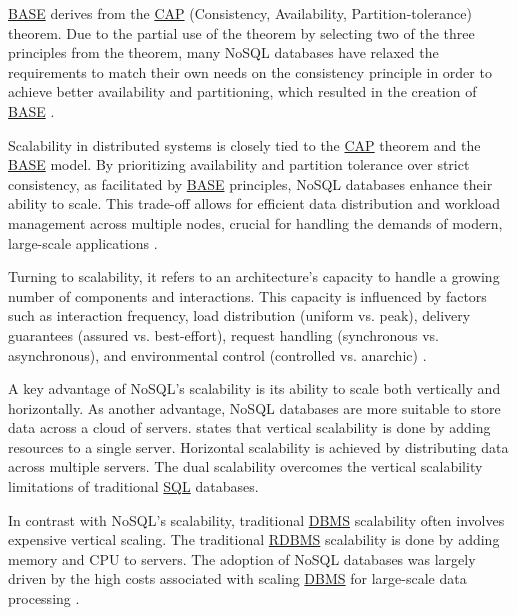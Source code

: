 \hyperref[appendix:glossary]{BASE} derives from the \hyperref[appendix:glossary]{CAP} (Consistency, Availability, Partition-tolerance) theorem. Due to the partial use of the theorem by selecting two of the three principles from the theorem, many NoSQL databases have relaxed the requirements to match their own needs on the consistency principle in order to achieve better availability and partitioning,  which resulted in the creation of \hyperref[appendix:glossary]{BASE} \cite{padhy2011rdbms}.

Scalability in distributed systems is closely tied to the \hyperref[appendix:glossary]{CAP} theorem and the \hyperref[appendix:glossary]{BASE} model. By prioritizing availability and partition tolerance over strict consistency, as facilitated by \hyperref[appendix:glossary]{BASE} principles, NoSQL databases enhance their ability to scale. This trade-off allows for efficient data distribution and workload management across multiple nodes, crucial for handling the demands of modern, large-scale applications \cite{brewer2012cap}.

Turning to scalability, it refers to an architecture's capacity to handle a growing number of components and interactions. This capacity is influenced by factors such as interaction frequency, load distribution (uniform vs. peak), delivery guarantees (assured vs. best-effort), request handling (synchronous vs. asynchronous), and environmental control (controlled vs. anarchic) \cite{fielding2000thesis}.

A key advantage of NoSQL's scalability is its ability to scale both vertically and horizontally. As another advantage, NoSQL databases are more suitable to store data across a cloud of servers. \cite{mason2015nosql, padhy2011rdbms} states that vertical scalability is done by adding resources to a single server. Horizontal scalability is achieved by distributing data across multiple servers. The dual scalability overcomes the vertical scalability limitations of traditional \hyperref[appendix:glossary]{SQL} databases.

In contrast with NoSQL's scalability, traditional \hyperref[appendix:glossary]{DBMS} scalability often involves expensive vertical scaling. The traditional \hyperref[appendix:glossary]{RDBMS} scalability is done by adding memory and CPU to servers. The adoption of NoSQL databases was largely driven by the high costs associated with scaling \hyperref[appendix:glossary]{DBMS} for large-scale data processing \cite{mason2015nosql, mohan2013history}.

